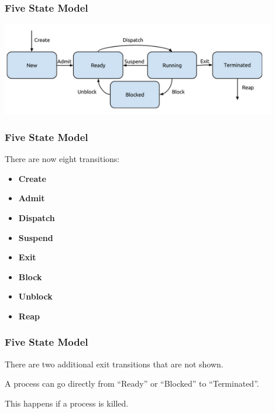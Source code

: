 \begin{frame}
\frametitle{Five State Model}

\begin{center}
\includegraphics[width=0.9\textwidth]{images/5-state-model.png}
\end{center}

\end{frame}

\begin{frame}
\frametitle{Five State Model}

There are now eight transitions:

\begin{itemize}
	\item \textbf{Create}
	\item \textbf{Admit}
	\item \textbf{Dispatch}
	\item \textbf{Suspend}
	\item \textbf{Exit}
	\item \textbf{Block}
	\item \textbf{Unblock}
	\item \textbf{Reap}
\end{itemize}

\end{frame}

\begin{frame}
\frametitle{Five State Model}

There are two additional exit transitions that are not shown.

A process can go directly from ``Ready'' or ``Blocked'' to ``Terminated''.

This happens if a process is killed.


\end{frame}




